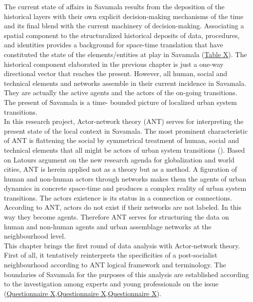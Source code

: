 \documentclass[11pt]{report}
\begin{document}
The current state of affairs in Savamala results from the deposition of the historical layers with their own explicit decision-making mechanisms of the time and its final blend with the current machinery of decision-making. Associating a spatial component to the structuralized historical deposits of data, procedures, and identities provides a background for space-time translation that have constituted the state of the elements/entities at play in Savamala (\href{ref}{Table X}). 
The historical component elaborated in the previous chapter is just a one-way directional vector that reaches the present. However, all human, social and technical elements and networks assemble in their current incidence in Savamala. They are actually the active agents and the actors of the on-going transitions. The present of Savamala is a time- bounded picture of localized urban system transitions. 
\\

In this research project, Actor-network theory (ANT) serves for interpreting the present state of the local context in Savamala. The most prominent characteristic of ANT is flattening the social by symmetrical treatment of human, social and technical elements that all might be actors of urban system transitions (\href{Latour}{\citealt{latour_reassembling_2005}}). 
Based on Latours argument on the new research agenda for globalization and world cities, ANT is herein applied not as a theory but as a method. A figuration of human and non-human actors through networks
makes them the agents of urban dynamics in concrete space-time and produces a complex reality of urban system transitions. The actors existence is its status in a connection or connections. According to ANT, actors do not exist if their networks are not labeled. In this way they become agents. Therefore ANT serves for structuring the data on human and non-human agents and urban assemblage networks at the neighbourhood level.
\\

This chapter brings the first round of data analysis with Actor-network theory. First of all, it tentatively reinterprets the specificities of a post-socialist neighbourhood according to ANT logical framework and terminology. The boundaries of Savamala for the purposes of this analysis are established according to the investigation among experts and young professionals on the issue (\href{Questionnaire Experts Savamala}{Questionnaire X},\href{Questionnaire PhD Savamala}{Questionnaire X},\href{Questionnaire Students Savamala}{Questionnaire X}).
\end{document}
